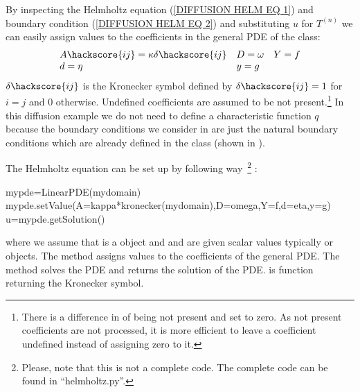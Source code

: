 By inspecting the Helmholtz equation  
(\ref{DIFFUSION HELM EQ 1}) and boundary condition (\ref{DIFFUSION HELM EQ 2}) and 
substituting $u$ for $T^{(n)}$ 
we can easily assign values to the coefficients in the 
general PDE of the \LinearPDE class:
\begin{equation}\label{DIFFUSION HELM EQ 3}
\begin{array}{llllll}
A\hackscore{ij}=\kappa \delta\hackscore{ij} & D=\omega & Y=f \\
d=\eta & y= g &  \\
\end{array}
\end{equation}
$\delta\hackscore{ij}$ is the Kronecker symbol  defined by $\delta\hackscore{ij}=1$ for
$i=j$ and $0$ otherwise. Undefined coefficients are assumed to be not present.\footnote{There is a difference 
in \escript of being not present and set to zero. As not present coefficients are not processed, 
it is more efficient to leave a coefficient undefined instead of assigning zero to it.} 
In this diffusion example we do not need to define a characteristic function $q$ because the 
boundary conditions we consider in  are just the natural boundary 
conditions which are already defined in the \LinearPDE class (shown in ).

The Helmholtz equation can be set up by following way~\footnote{Please, note that this is not a complete code. The complete code can be found in ``helmholtz.py''. } :
\begin{python}
mypde=LinearPDE(mydomain)
mypde.setValue(A=kappa*kronecker(mydomain),D=omega,Y=f,d=eta,y=g)
u=mypde.getSolution()
\end{python}
where we assume that  is a \Domain object and 
   and  are given scalar values 
typically  or \Data objects. The  method 
assigns values to the coefficients of the general PDE. The  method solves 
the PDE and returns the solution  of the PDE.  is \escript function
returning the Kronecker symbol.

